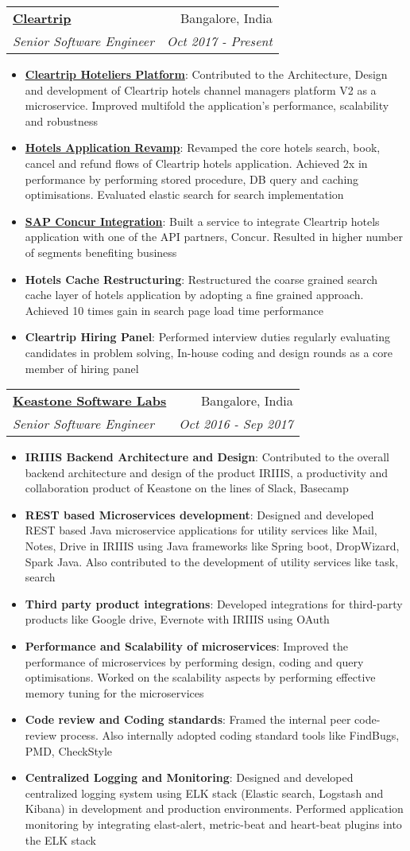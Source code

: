 \documentclass[letterpaper,11pt]{article}
\makeatletter
\newcommand{\resumeItem}[2]{
  \item\small{
    \textbf{#1}{: #2 \vspace{-2pt}}
  }
}
\newcommand{\resumeSubheading}[4]{
  \vspace{-1pt}\item
    \begin{tabular*}{0.97\textwidth}{l@{\extracolsep{\fill}}r}
      \textbf{#1} & #2 \\
      \textit{\small#3} & \textit{\small #4} \\
    \end{tabular*}\vspace{-5pt}
}
\newcommand{\resumeItemListStart}{\begin{itemize}}
\newcommand{\resumeItemListEnd}{\end{itemize}\vspace{-5pt}}
\makeatother
\begin{document}
    \resumeSubheading
      {\href{www.cleartrip.com}{Cleartrip}}{Bangalore, India}
      {Senior Software Engineer}{Oct 2017 - Present}
      \resumeItemListStart
          \resumeItem{\href{https://suite.cleartrip.com/login}{Cleartrip Hoteliers Platform}}
          {Contributed to the Architecture, Design and development of Cleartrip hotels channel managers platform V2 as a microservice. Improved multifold the application's performance, scalability and robustness }
          \resumeItem{\href{https://www.cleartrip.com/hotels}{Hotels Application Revamp}}
          {Revamped the core hotels search, book, cancel and refund flows of Cleartrip hotels application. Achieved 2x in performance by performing stored procedure, DB query and caching optimisations. Evaluated elastic search for search implementation}
          \resumeItem{\href{https://www.concur.co.in/travel-management}{SAP Concur Integration}}
          {Built a service to integrate Cleartrip hotels application with one of the API partners, Concur. Resulted in higher number of segments benefiting business}
          \resumeItem{Hotels Cache Restructuring}
          {Restructured the coarse grained search cache layer of hotels application by adopting a fine grained approach. Achieved 10 times gain in search page load time performance}
          \resumeItem{Cleartrip Hiring Panel}
          {Performed interview duties regularly evaluating candidates in problem solving, In-house coding and design rounds as a core member of hiring panel}
      \resumeItemListEnd
      
    \resumeSubheading
      {\href{http://www.keastone.com/}{Keastone Software Labs}}{Bangalore, India}
      {Senior Software Engineer}{Oct 2016 - Sep 2017}
      \resumeItemListStart
          \resumeItem{IRIIIS Backend Architecture and Design}
          {Contributed to the overall backend architecture and design of the product IRIIIS, a productivity and collaboration product of Keastone on the lines of Slack, Basecamp }
          \resumeItem{REST based Microservices development}
          {Designed and developed REST based Java microservice applications for utility services like Mail, Notes, Drive in IRIIIS using Java frameworks like Spring boot, DropWizard, Spark Java. Also contributed to the development of utility services like task, search }
          \resumeItem{Third party product integrations}
          {Developed integrations for third-party products like Google drive, Evernote with IRIIIS using OAuth}
          \resumeItem{Performance and Scalability of microservices}
          {Improved the performance of microservices by performing design, coding and query optimisations. Worked on the scalability aspects by performing effective memory tuning for the microservices}
          \resumeItem{Code review and Coding standards}
          {Framed the internal peer code-review process. Also internally adopted coding standard tools like FindBugs, PMD, CheckStyle}
           \resumeItem{Centralized Logging and Monitoring}
          {Designed and developed centralized logging system using ELK stack (Elastic search, Logstash and Kibana) in development and production environments. Performed application monitoring by integrating elast-alert, metric-beat and heart-beat plugins into the ELK stack}
      \resumeItemListEnd
\end{document}
